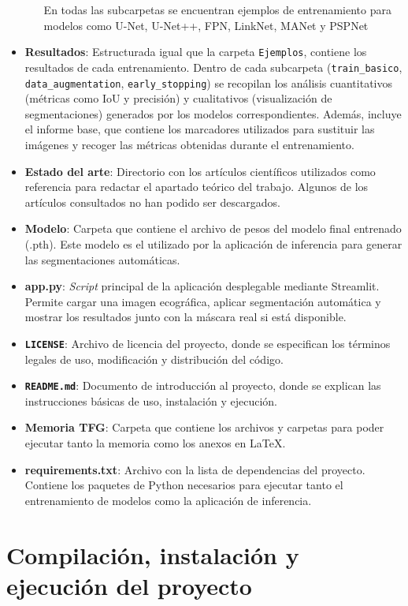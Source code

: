 \begin{itemize}
\begin{itemize}
    En todas las subcarpetas se encuentran ejemplos de entrenamiento para modelos como U-Net, U-Net++, FPN, LinkNet, MANet y PSPNet 
    \end{itemize}
    \item \textbf{Resultados}: Estructurada igual que la carpeta \texttt{Ejemplos}, contiene los resultados de cada entrenamiento. Dentro de cada subcarpeta (\texttt{train\_basico}, \texttt{data\_augmentation}, \texttt{early\_stopping}) se recopilan los análisis cuantitativos (métricas como IoU y precisión) y cualitativos (visualización de segmentaciones) generados por los modelos correspondientes. Además, incluye el informe base, que contiene los marcadores utilizados para sustituir las imágenes y recoger las métricas obtenidas durante el entrenamiento.
    \item \textbf{Estado del arte}: Directorio con los artículos científicos utilizados como referencia para redactar el apartado teórico del trabajo. Algunos de los artículos consultados no han podido ser descargados. 
    \item \textbf{Modelo}: Carpeta que contiene el archivo de pesos del modelo final entrenado (.pth). Este modelo es el utilizado por la aplicación de inferencia para generar las segmentaciones automáticas.
    \item \textbf{app.py}: \textit{Script} principal de la aplicación desplegable mediante Streamlit. Permite cargar una imagen ecográfica, aplicar segmentación automática y mostrar los resultados junto con la máscara real si está disponible.
    \item \textbf{\texttt{LICENSE}}: Archivo de licencia del proyecto, donde se especifican los términos legales de uso, modificación y distribución del código.
    \item \textbf{\texttt{README.md}}: Documento de introducción al proyecto, donde se explican las instrucciones básicas de uso, instalación y ejecución.
    \item \textbf{Memoria TFG}: Carpeta que contiene los archivos y carpetas para poder ejecutar tanto la memoria como los anexos en LaTeX. 
    \item \textbf{requirements.txt}: Archivo con la lista de dependencias del proyecto. Contiene los paquetes de Python necesarios para ejecutar tanto el entrenamiento de modelos como la aplicación de inferencia. 
\end{itemize}  

\section{Compilación, instalación y ejecución del proyecto}

